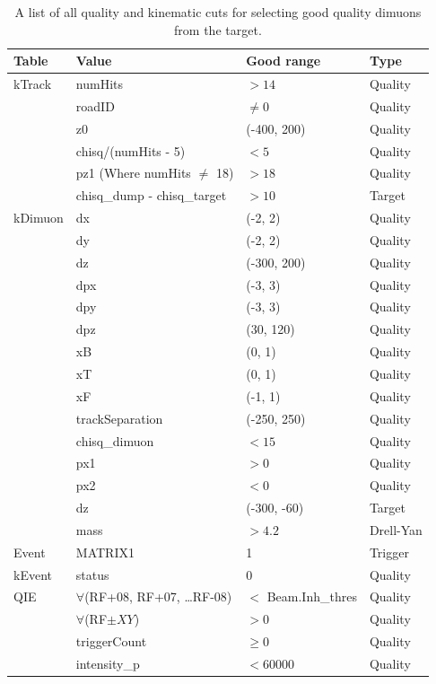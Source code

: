 \begin{table}
	\centering
	\begin{tabular}{@{}llll@{}} \midrule
		\textbf{Table} & \textbf{Value}  & \textbf{Good range} & \textbf{Type} \\ \toprule
kTrack & numHits & $>14$ & Quality \\
 & roadID & $\neq0$ & Quality \\
 & z0  & (-400, 200)  & Quality \\
 & chisq/(numHits - 5) & $<5$ & Quality \\
 & pz1 (Where numHits $\neq$ 18) & $>18$ & Quality \\
 & chisq\_dump - chisq\_target & $>10$ & Target \\ \midrule
kDimuon & dx & (-2, 2)  & Quality \\
 & dy & (-2, 2)  & Quality \\
 & dz & (-300, 200)  & Quality \\
 & dpx & (-3, 3)  & Quality \\
 & dpy & (-3, 3)  & Quality \\
 & dpz & (30, 120)  & Quality \\
 & xB & (0, 1)  & Quality \\
 & xT & (0, 1)  & Quality \\
 & xF & (-1, 1)  & Quality \\
 & trackSeparation & (-250, 250)  & Quality \\
 & chisq\_dimuon & $<15$ & Quality \\
 & px1 & $>0$ & Quality \\
 & px2 & $<0$ & Quality \\
 & dz & (-300, -60)  & Target \\
 & mass & $>4.2$ & Drell-Yan \\ \midrule
Event & MATRIX1 & 1 & Trigger \\ \midrule
kEvent & status & 0 & Quality \\ \midrule
QIE & $\forall$(RF+08, RF+07, \ldots RF-08) & $<$ Beam.Inh\_thres & Quality \\
 & $\forall$(RF$\pm XY$) & $>0$ & Quality \\
 & triggerCount & $\geq0$ & Quality \\
 & intensity\_p & $<60000$ & Quality \\
\bottomrule
\end{tabular}
\caption{A list of all quality and kinematic cuts for selecting good quality dimuons from the target.}
\label{tab:all-other-cuts}
\end{table}

